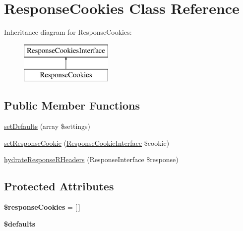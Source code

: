 \hypertarget{class_pes_1_1_http_1_1_cookies_1_1_response_cookies}{}\section{Response\+Cookies Class Reference}
\label{class_pes_1_1_http_1_1_cookies_1_1_response_cookies}
Inheritance diagram for Response\+Cookies\+:\begin{figure}[H]
\begin{center}
\leavevmode
\includegraphics[height=2.000000cm]{class_pes_1_1_http_1_1_cookies_1_1_response_cookies}
\end{center}
\end{figure}
\subsection*{Public Member Functions}
\begin{DoxyCompactItemize}
\item 
\mbox{\hyperlink{class_pes_1_1_http_1_1_cookies_1_1_response_cookies_a462328426f473092af4994841a3bb3de}{set\+Defaults}} (array \$settings)
\item 
\mbox{\hyperlink{class_pes_1_1_http_1_1_cookies_1_1_response_cookies_a3eb38fba7bb5b61b9a0e4b4887168ff7}{set\+Response\+Cookie}} (\mbox{\hyperlink{interface_pes_1_1_http_1_1_cookies_1_1_response_cookie_interface}{Response\+Cookie\+Interface}} \$cookie)
\item 
\mbox{\hyperlink{class_pes_1_1_http_1_1_cookies_1_1_response_cookies_a7e113803ed4166b2bab9f6f68ca75921}{hydrate\+Response\+R\+Headers}} (Response\+Interface \$response)
\end{DoxyCompactItemize}
\subsection*{Protected Attributes}
\begin{DoxyCompactItemize}
\item 
\mbox{\label{class_pes_1_1_http_1_1_cookies_1_1_response_cookies_afb88a58163f6e4aed38fcfce9e906541}} 
{\bfseries \$response\+Cookies} = \mbox{[}$\,$\mbox{]}
\item 
{\bfseries \$defaults}
\end{DoxyCompactItemize}


